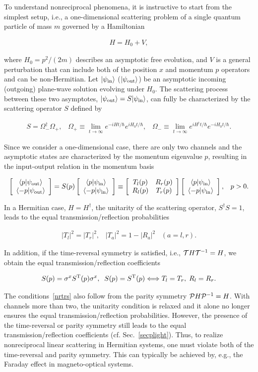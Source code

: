 \documentclass{tADP2e}
\theoremstyle{plain}
\newcommand{\eqn}[1]{
\begin{eqnarray}
	#1
\end{eqnarray}
}
\theoremstyle{plain}
\theoremstyle{definition}
\begin{document}
To understand nonreciprocal phenomena, it is instructive to start from the simplest setup, i.e.,  a one-dimensional scattering problem of a single quantum particle of mass $m$ governed by a Hamiltonian
\eqn{
H  =  H_{0}+V,
}
where $H_0=p^2/(2m)$ describes an asymptotic free evolution, and $V$ is a general perturbation that can include both of the position $x$ and momentum $p$ operators and can be non-Hermitian. Let $|\psi_{{\rm in}}\rangle$ ($|\psi_{{\rm out}}\rangle$) be an asymptotic incoming (outgoing) plane-wave solution evolving under $H_{0}$. The scattering process between these two asymptotes, $|\psi_{{\rm out}}\rangle=S|\psi_{{\rm in}}\rangle$,
can fully be characterized by the scattering operator $S$ defined
by
\eqn{
S  =  \Omega_{-}^{\dagger}\Omega_{+},\;\;\;\Omega_{+}  \equiv  \lim_{t\to\infty}e^{-iHt/\hbar}e^{iH_{0}t/\hbar},\;\;\;\Omega_{-} \equiv  \lim_{t\to\infty}e^{iH^{\dagger}t/\hbar}e^{-iH_{0}t/\hbar}.
}
Since we consider a one-dimensional case, there are only two channels and the asymptotic states are characterized by the momentum eigenvalue $p$, resulting in the input-output relation in the momentum basis
\eqn{
\left[\begin{array}{c}
\langle p|\psi_{{\rm out}}\rangle\\
\langle-p|\psi_{{\rm out}}\rangle
\end{array}\right] =  S(p)\left[\begin{array}{c}
\langle p|\psi_{{\rm in}}\rangle\\
\langle-p|\psi_{{\rm in}}\rangle
\end{array}\right]\equiv\left[\begin{array}{cc}
T_{l}(p) & R_{r}(p)\\
R_{l}(p) & T_{r}(p)
\end{array}\right]\left[\begin{array}{c}
\langle p|\psi_{{\rm in}}\rangle\\
\langle-p|\psi_{{\rm in}}\rangle
\end{array}\right],\;\;\;p>0.
}

In a Hermitian case, $H=H^\dagger$, the unitarity of the scattering operator, $S^\dagger S=1$, leads to the equal transmission/reflection probabilities 
\eqn{
\left|T_{l}\right|^{2}=\left|T_{r}\right|^{2}, \;\;\; \left|T_{a}\right|^{2}=1-\left|R_{a}\right|^{2} \;\;\; (a=l,r).
}
In addition, if the time-reversal symmetry is satisfied, i.e., ${\cal T}H{\cal T}^{-1}=H$, we obtain the equal transmission/reflection coefficients 
\eqn{\label{nrtrs}
S(p)=\sigma^{x}S^{\rm T}(p)\sigma^{x},\;\;S(p)=S^{\rm T}(p)\Longleftrightarrow  T_{l}=T_{r}, \; R_{l}=R_{r}.
} 
The conditions~\eqref{nrtrs} also follow from the parity symmetry ${\cal P}H{\cal P}^{-1}=H$. With channels more than two, the unitarity condition is relaxed and it alone no longer ensures the equal transmission/reflection probabilities. However, the presence of the time-reversal or parity symmetry still leads to the equal transmission/reflection coefficients (cf. Sec.~\ref{secplight}). Thus, to realize nonreciprocal linear scattering in Hermitian systems, one must violate both of the time-reversal and parity symmetry. This can typically be achieved by, e.g., the Faraday effect in magneto-optical systems.
\end{document}
